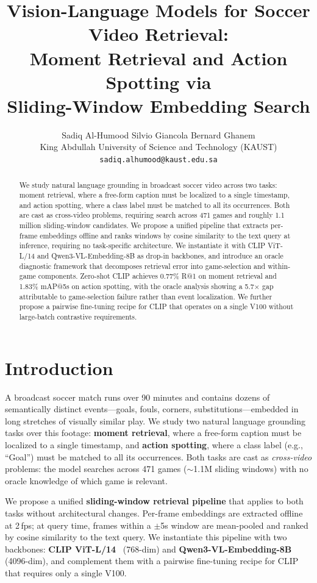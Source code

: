 \documentclass[10pt,twocolumn]{article}
\title{%
  Vision-Language Models for Soccer Video Retrieval:\\
  Moment Retrieval and Action Spotting via\\
  Sliding-Window Embedding Search
}
\author{
  Sadiq Al-Humood \quad Silvio Giancola \quad Bernard Ghanem \\
  King Abdullah University of Science and Technology (KAUST) \\
  \texttt{sadiq.alhumood@kaust.edu.sa}
}
\date{}
\begin{document}
\maketitle

\begin{abstract}
We study natural language grounding in broadcast soccer video across two tasks: moment retrieval, where a free-form caption must be localized to a single timestamp, and action spotting, where a class label must be matched to all its occurrences. Both are cast as cross-video problems, requiring search across 471 games and roughly 1.1 million sliding-window candidates. We propose a unified pipeline that extracts per-frame embeddings offline and ranks windows by cosine similarity to the text query at inference, requiring no task-specific architecture. We instantiate it with CLIP ViT-L/14 and Qwen3-VL-Embedding-8B as drop-in backbones, and introduce an oracle diagnostic framework that decomposes retrieval error into game-selection and within-game components. Zero-shot CLIP achieves 0.77\% R@1 on moment retrieval and 1.83\% mAP@5s on action spotting, with the oracle analysis showing a 5.7$\times$ gap attributable to game-selection failure rather than event localization. We further propose a pairwise fine-tuning recipe for CLIP that operates on a single V100 without large-batch contrastive requirements.
\end{abstract}

\section{Introduction}

A broadcast soccer match runs over 90 minutes and contains dozens of semantically distinct events---goals, fouls, corners, substitutions---embedded in long stretches of visually similar play. We study two natural language grounding tasks over this footage: \textbf{moment retrieval}, where a free-form caption must be localized to a single timestamp, and \textbf{action spotting}, where a class label (e.g., ``Goal'') must be matched to all its occurrences. Both tasks are cast as \emph{cross-video} problems: the model searches across 471 games (${\sim}$1.1M sliding windows) with no oracle knowledge of which game is relevant.

We propose a unified \textbf{sliding-window retrieval pipeline} that applies to both tasks without architectural changes. Per-frame embeddings are extracted offline at 2\,fps; at query time, frames within a $\pm$5s window are mean-pooled and ranked by cosine similarity to the text query. We instantiate this pipeline with two backbones: \textbf{CLIP ViT-L/14}~\cite{radford2021clip} (768-dim) and \textbf{Qwen3-VL-Embedding-8B}~\cite{qwen3vl} (4096-dim), and complement them with a pairwise fine-tuning recipe for CLIP that requires only a single V100.
\end{document}
